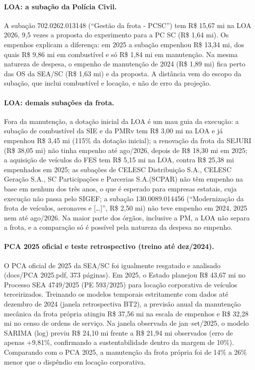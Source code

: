 \paragraph{LOA: a subação da Polícia Civil.} A subação 702.0262.013148 (``Gestão da frota - PCSC'') tem R\$ 15,67 mi na LOA 2026, 9,5 vezes a proposta do experimento para a PC SC (R\$ 1,64 mi). Os empenhos explicam a diferença: em 2025 a subação empenhou R\$ 13,34 mi, dos quais R\$ 9,86 mi em combustível e só R\$ 1,84 mi em manutenção. Na mesma natureza de despesa, o empenho de manutenção de 2024 (R\$ 1,89 mi) fica perto das OS da SEA/SC (R\$ 1,63 mi) e da proposta. A distância vem do escopo da subação, que inclui combustível e locação, e não de erro da projeção.

\paragraph{LOA: demais subações da frota.} Fora da manutenção, a dotação inicial da LOA é um mau guia da execução: a subação de combustível da SIE e da PMRv tem R\$ 3,00 mi na LOA e já empenhou R\$ 3,45 mi (115\% da dotação inicial); a renovação da frota da SEJURI (R\$ 38,05 mi) não tinha empenho até ago/2026, depois de R\$ 18,30 mi em 2025; a aquisição de veículos do FES tem R\$ 5,15 mi na LOA, contra R\$ 25,38 mi empenhados em 2025; as subações de CELESC Distribuição S.A., CELESC Geração S.A., SC Participações e Parcerias S.A.(SCPAR) não têm empenho na base em nenhum dos três anos, o que é esperado para empresas estatais, cuja execução não passa pelo SIGEF; a subação 130.0089.014456 (``Modernização da frota de veículos, aeronaves e [\ldots{}]'', R\$ 2,50 mi) não teve empenho em 2024, 2025 nem até ago/2026. Na maior parte dos órgãos, inclusive a PM, a LOA não separa a frota, e a comparação só é possível pela natureza da despesa no empenho.

\paragraph{PCA 2025 oficial e teste retrospectivo (treino até dez/2024).} O PCA oficial de 2025 da SEA/SC foi igualmente resgatado e analisado (docs/PCA 2025.pdf, 373 páginas). Em 2025, o Estado planejou R\$ 43,67 mi no Processo SEA 4749/2025 (PE 593/2025) para locação corporativa de veículos terceirizados. Treinando os modelos temporais estritamente com dados até dezembro de 2024 (janela retrospectiva BT2), a previsão anual da manutenção mecânica da frota própria atingiu R\$ 37,56 mi na escala de empenhos e R\$ 32,28 mi no censo de ordens de serviço. Na janela observada de jan--set/2025, o modelo SARIMA (log) previu R\$ 24,10 mi frente a R\$ 21,94 mi observados (erro de apenas +9,81\%, confirmando a sustentabilidade dentro da margem de 10\%). Comparando com o PCA 2025, a manutenção da frota própria foi de 14\% a 26\% menor que o dispêndio em locação corporativa.

